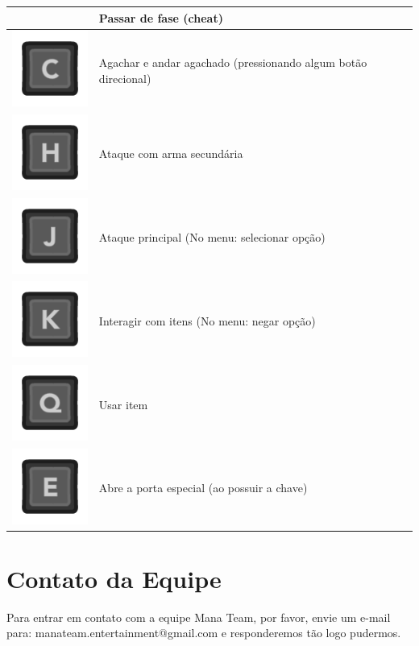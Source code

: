 \documentclass[12pt]{article}
\begin{document}
\begin{longtable}{|c|p{10cm}|}
& Passar de fase (cheat) 
\\
\hline
\includegraphics[scale=0.3]{images/kC.png}
& Agachar e andar agachado (pressionando algum botão direcional)
\\
\hline
\includegraphics[scale=0.3]{images/kH.png}
& Ataque com arma secundária
\\
\hline
\includegraphics[scale=0.3]{images/kJ.png}
& Ataque principal (No menu: selecionar opção)
\\
\hline
\includegraphics[scale=0.3]{images/kK.png}
& Interagir com itens (No menu: negar opção)
\\
\hline
\includegraphics[scale=0.3]{images/kQ.png}
& Usar item 
\\
\hline
\includegraphics[scale=0.3]{images/kE.png}
& Abre a porta especial (ao possuir a chave) 
\\
\hline
\end{longtable}



\section{Contato da Equipe}
Para entrar em contato com a equipe Mana Team, por favor, envie um e-mail para: manateam.entertainment@gmail.com e responderemos tão logo pudermos.
\end{document}
